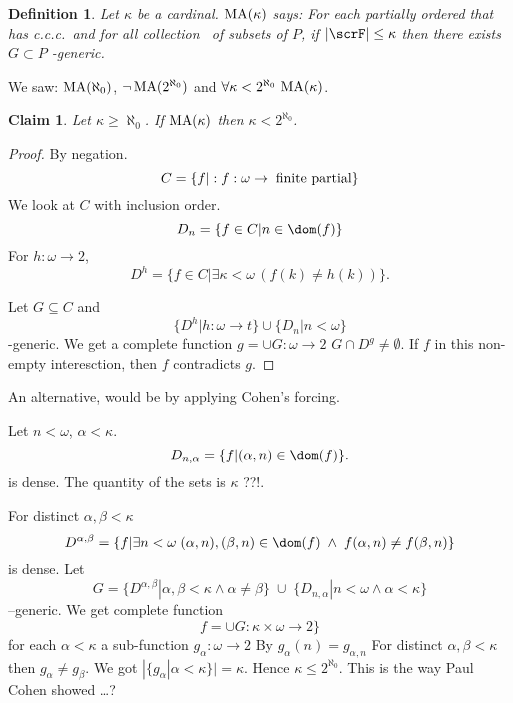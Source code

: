 \documentclass[11pt,pdftex,twoside,a4paper]{article}
\newcommand{\MA}{\ensuremath{\mathop{\rm MA}\nolimits}}
\newcommand{\ccc}{c.c.c.}
\newtheorem{ldef}[thm]{Definition}
\newtheorem{claim}[thm]{Claim}
\begin{document}
\begin{ldef}
Let \(\kappa\) be a cardinal.
\(\MA(\kappa)\) says: For each partially ordered  that 
has \ccc\ and for all collection \scrF\ of subsets of $P$,
if \(|\scrF| \leq \kappa\) then there exists \(G\subset P\) \scrF-generic.
\end{ldef}
We saw: \(\MA(\aleph_0)\), \(\lnot\MA(2^{\aleph_0})\) and 
\(\forall \kappa < 2^{\aleph_0}\, \MA(\kappa)\).

\begin{claim}
Let \(\kappa \geq \aleph_0\). If \(\MA(\kappa)\) then \(\kappa < 2^{\aleph_0}\).
\end{claim}
\begin{proof}
By negation.
\begin{equation*}
C = \{f|: f: \omega \to \;\textnormal{finite partial}\}
\end{equation*}
We look at $C$ with inclusion order.
\begin{equation*}
D_n = \{f\in C| n \in \dom(f)\}
\end{equation*}
For \(h:\omega\to 2\),
\begin{equation*}
D^h = \{f\in C | \exists \kappa < \omega\, (f(k)\neq h(k))\}.
\end{equation*}

Let \(G\subseteq C\) and 
\begin{equation*}
\{D^h | h:\omega\to t\} \cup \{D_n | n < \omega\}
\end{equation*}
-generic. We get a complete function \(g = \cup G:\omega \to 2\)
\(G \cap D^g\neq \emptyset\). 
If $f$ in this non-empty interesction, then $f$ contradicts $g$.
\end{proof}

An alternative, would be by applying Cohen's forcing.

Let \(n<\omega\), \(\alpha < \kappa\).
\begin{equation*}
D_{n,\alpha} = \{f | (\alpha,n)\in \dom(f)\}.
\end{equation*}
is dense. The quantity of the sets is \(\kappa\) ??!.

For distinct \(\alpha,\beta < \kappa\)
\begin{equation*}
D^{\alpha,\beta} = \{f | \exists n < \omega\; (\alpha,n),(\beta,n)\in \dom(f)
\;\land\; f(\alpha,n) \neq f(\beta,n)\}
\end{equation*}
is dense. Let
\begin{equation*}
G = \{D^{\alpha,\beta}| \alpha,\beta<\kappa\land \alpha\neq\beta\}
\;\cup\; \{D_{n,\alpha} | n < \omega \land \alpha < \kappa\}
\end{equation*}
--generic. We get complete function
\begin{equation*}
f = \cup G: \kappa\times\omega \to 2\}
\end{equation*}
for each \(\alpha<\kappa\) a sub-function \(g_\alpha : \omega \to 2\)
By \(g_\alpha(n) = g_{\alpha,n}\)
For distinct \(\alpha,\beta <\kappa\) then \(g_\alpha \neq g_\beta\).
We got \(|\{g_\alpha | \alpha < \kappa\}|= \kappa\).
Hence \(\kappa \leq 2^{\aleph_0}\).
This is the way Paul Cohen showed \ldots ?
\end{document}
